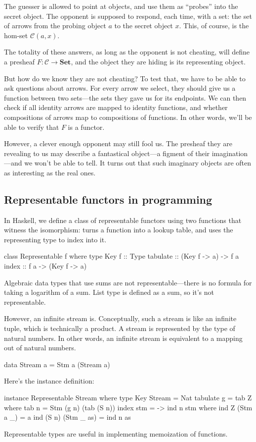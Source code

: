 \documentclass[DaoFP]{subfiles}
\begin{document}
The guesser is allowed to point at objects, and use them as ``probes'' into the secret object. The opponent is supposed to respond, each time, with a set: the set of arrows from the probing object $a$ to the secret object $x$. This, of course, is the hom-set $\mathcal{C}(a, x)$. 

The totality of these answers, as long as the opponent is not cheating, will define a presheaf $F \colon \mathcal{C} \to \mathbf{Set}$, and the object they are hiding is its representing object. 

But how do we know they are not cheating? To test that, we have to be able to ask questions about arrows. For every arrow we select, they should give us a function between two sets---the sets they gave us for its endpoints. We can then check if all identity arrows are mapped to identity functions, and whether compositions of arrows map to compositions of functions. In other words, we'll be able to verify that $F$ is a functor. 

However, a clever enough opponent may still fool us. The presheaf they are revealing to us may describe a fantastical object---a figment of their imagination---and we won't be able to tell. It turns out that such imaginary objects are often as interesting as the real ones. 

\subsection{Representable functors in programming}

In Haskell, we define a class of representable functors using two functions that witness the isomorphism:  turns a function into a lookup table, and  uses the representing type  to index into it.

\begin{haskell}
class Representable f where
  type Key f :: Type
  tabulate :: (Key f -> a) -> f a
  index    :: f a -> (Key f -> a)
\end{haskell}

Algebraic data types that use sums are not representable---there is no formula for taking a logarithm of a sum. List type is defined as a sum, so it's not representable. 

However, an infinite stream is. Conceptually, such a stream is like an infinite tuple, which is technically a product. A stream is represented by the type of natural numbers. In other words, an infinite stream is equivalent to a mapping out of natural numbers. 
\begin{haskell}
data Stream a = Stm a (Stream a)
\end{haskell}
Here's the instance definition:
\begin{haskell}
instance Representable Stream where
  type Key Stream = Nat
  tabulate g = tab Z
    where
      tab n = Stm (g n) (tab (S n))
  index stm = \n -> ind n stm
    where
      ind Z (Stm a _) = a
      ind (S n) (Stm _ as) = ind n as
\end{haskell}
Representable types are useful in implementing memoization of functions.
\end{document}
